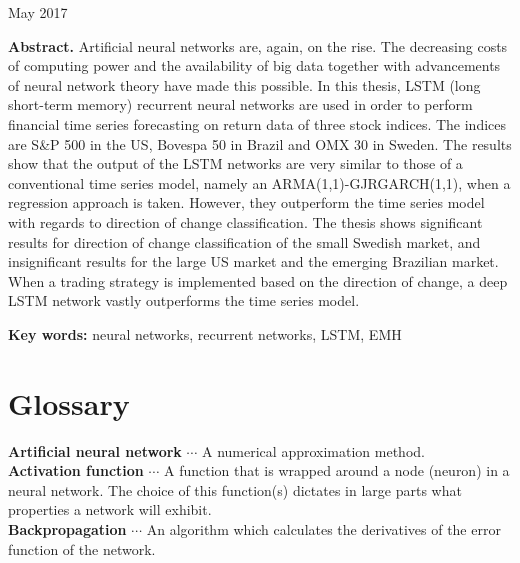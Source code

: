 \documentclass[12pt, letterpaper]{amsart}%
\begin{document}
\begin{titlepage}
\begin{center}
\vspace{1cm}

\large{May 2017}
\end{center}

\vspace{1cm}

\small{\textbf{Abstract.} Artificial neural networks are, again, on the rise. The decreasing costs of computing power and the availability of big data together with advancements of neural network theory have made this possible. In this thesis, LSTM (long short-term memory) recurrent neural networks are used in order to perform financial time series forecasting on return data of three stock indices. The indices are S\&P 500 in the US, Bovespa 50 in Brazil and OMX 30 in Sweden. The results show that the output of the LSTM networks are very similar to those of a conventional time series model, namely an ARMA(1,1)-GJRGARCH(1,1), when a regression approach is taken. However, they outperform the time series model with regards to direction of change classification. The thesis shows significant results for direction of change classification of the small Swedish market, and insignificant results for the large US market and the emerging Brazilian market. When a trading strategy is implemented based on the direction of change, a deep LSTM network vastly outperforms the time series model.}

\vfill

\small{\textbf{Key words:} neural networks, recurrent networks, LSTM, EMH}
\end{titlepage}

\newpage


\newpage
\tableofcontents
\newpage

\section*{Glossary}
\noindent
\textbf{Artificial neural network} $\cdots$ A numerical approximation method.
\\

\noindent
\textbf{Activation function} $\cdots$ A function that is wrapped around a node (neuron) in a neural network. The choice of this function(s) dictates in large parts what properties a network will exhibit.
\\

\noindent
\textbf{Backpropagation} $\cdots$ An algorithm which calculates the derivatives of the error function of the network.
\\
\end{document}
